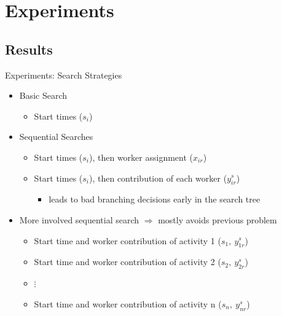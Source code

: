 \documentclass{beamer}
\begin{document}
\section{Experiments}

\subsection{Results}
\begin{frame}{Experiments: Search Strategies}

	\begin{itemize}
		\item Basic Search
		\begin{itemize}
			\item  Start times ($s_i$)
		\end{itemize}\pause
			\vspace{2mm}
		\item Sequential Searches
		\begin{itemize}
			\item Start times ($s_i$), then worker assignment ($x_{ir}$)
			\item Start times ($s_i$), then contribution of each worker ($y_{ir}^s$)\pause
			\begin{itemize}
				\item leads to bad branching decisions early in the search tree\pause
			\end{itemize}
		\end{itemize}
		\item More involved sequential search $\Rightarrow$ mostly avoids previous problem
		\begin{itemize}
			\item Start time and worker contribution of activity 1 ($s_1,~y_{1r}^s$)
			\item Start time and worker contribution of activity 2 ($s_2,~y_{2r}^s$)
			\item $\vdots$
			\item Start time and worker contribution of activity n ($s_n,~y_{nr}^s$)
		\end{itemize}
	\end{itemize}
\end{frame}
\end{document}
